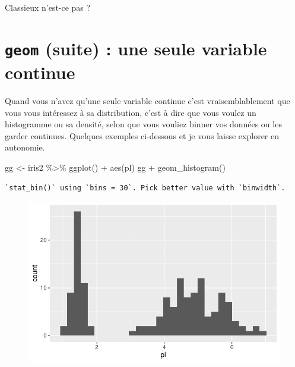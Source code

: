 \documentclass[
  letterpaper,
  DIV=11,
  numbers=noendperiod]{scrreprt}
\newenvironment{Shaded}{\begin{snugshade}}{\end{snugshade}}
\newcommand{\FunctionTok}[1]{\textcolor[rgb]{0.28,0.35,0.67}{#1}}
\newcommand{\NormalTok}[1]{\textcolor[rgb]{0.00,0.23,0.31}{#1}}
\newcommand{\OtherTok}[1]{\textcolor[rgb]{0.00,0.23,0.31}{#1}}
\newcommand{\SpecialCharTok}[1]{\textcolor[rgb]{0.37,0.37,0.37}{#1}}
\begin{document}
Classieux n'est-ce pas ?

\hypertarget{geom-suite-une-seule-variable-continue}{%
\section{\texorpdfstring{\texttt{geom} (suite) : une seule variable
continue}{geom (suite) : une seule variable continue}}\label{geom-suite-une-seule-variable-continue}}

Quand vous n'avez qu'une seule variable continue c'est vraisemblablement
que vous vous intéressez à sa distribution, c'est à dire que vous voulez
un histogramme ou sa densité, selon que vous vouliez binner vos données
ou les garder continues. Quelques exemples ci-dessous et je vous laisse
explorer en autonomie.

\begin{Shaded}
\begin{Highlighting}[]
\NormalTok{gg }\OtherTok{\textless{}{-}}\NormalTok{ iris2 }\SpecialCharTok{\%\textgreater{}\%} \FunctionTok{ggplot}\NormalTok{() }\SpecialCharTok{+} \FunctionTok{aes}\NormalTok{(pl)}
\NormalTok{gg }\SpecialCharTok{+} \FunctionTok{geom\_histogram}\NormalTok{()}
\end{Highlighting}
\end{Shaded}

\begin{verbatim}
`stat_bin()` using `bins = 30`. Pick better value with `binwidth`.
\end{verbatim}

\begin{figure}[H]

{\centering \includegraphics{ggplot2_files/figure-pdf/unnamed-chunk-24-1.pdf}

}

\end{figure}
\end{document}
